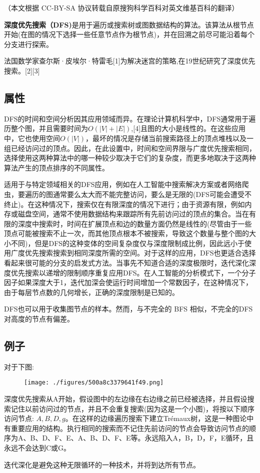 
（本文根据 CC-BY-SA 协议转载自原搜狗科学百科对英文维基百科的翻译）

\textbf{深度优先搜索（DFS)}是用于遍历或搜索树或图数据结构的算法。该算法从根节点开始(在图的情况下选择一些任意节点作为根节点)，并在回溯之前尽可能沿着每个分支进行探索。

法国数学家查尔斯·皮埃尔·特雷毛[1]为解决迷宫的策略,在19世纪研究了深度优先搜索。[2][3]

\subsection{属性}
DFS的时间和空间分析因其应用领域而异。在理论计算机科学中，DFS通常用于遍历整个图，并且需要时间为$O(|V| + |E|)$,[4]且图的大小是线性的。在这些应用中，它也使用空间$O(|V|)$，最坏的情况是存储当前搜索路径上的顶点堆栈以及一组已经访问过的顶点。因此，在此设置中，时间和空间界限与广度优先搜索相同，选择使用这两种算法中的哪一种较少取决于它们的复杂度，而更多地取决于这两种算法产生的顶点排序的不同属性。

适用于与特定领域相关的DFS应用，例如在人工智能中搜索解决方案或者网络爬虫，要遍历的图通常要么太大而不能完整访问，要么是无限的(DFS可能会遭受不终止)。在这种情况下，搜索仅在有限深度的情况下进行；由于资源有限，例如内存或磁盘空间，通常不使用数据结构来跟踪所有先前访问过的顶点的集合。当在有限的深度中搜索时，时间在扩展顶点和边的数量方面仍然是线性的(尽管由于一些顶点可能被搜索不止一次，而其他顶点根本不被搜索，导致这个数量与整个图的大小不同)，但是DFS的这种变体的空间复杂度仅与深度限制成比例，因此远小于使用广度优先搜索搜索到相同深度所需的空间。对于这样的应用，DFS也更适合选择看起来很可能的分支的启发式方法。当事先不知道合适的深度极限时，迭代深化深度优先搜索以递增的限制顺序重复应用DFS。在人工智能的分析模式下，一个分子因子如果深度大于1，迭代加深会使运行时间增加一个常数因子，在这种情况下，由于每层节点数的几何增长，正确的深度限制是已知的。

DFS也可以用于收集图节点的样本。然而，与不完全的 BFS 相似，不完全的DFS对高度的节点有偏差。

\subsection{例子}
对于下图:
\begin{figure}[ht]
\centering
\texttt{[image: ./figures/500a8c3379641f49.png]}
\caption\label{fig_SDYXSS_1}
\end{figure}
深度优先搜索从A开始，假设图中的左边缘在右边缘之前已经被选择，并且假设搜索记住以前访问过的节点，并且不会重复搜索(因为这是一个小图)，将按以下顺序访问节点: $A,B,D,g$。在这样的边缘遍历搜索下建立Trémaux树，这是一种图论中有重要应用的结构。执行相同的搜索而不记住先前访问的节点会导致访问节点的顺序为A、B、D、F、E、A、B、D、F、E等。永远陷入A，B，D，F，E循环，且永远不会达到C或G。

迭代深化是避免这种无限循环的一种技术，并将到达所有节点。